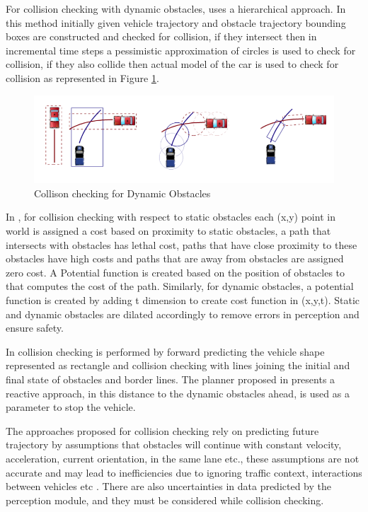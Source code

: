For collision checking with dynamic obstacles, \cite{kolski_thesis} uses a hierarchical approach. In this method initially given vehicle trajectory and obstacle trajectory bounding boxes are constructed and checked for collision, if they intersect then in incremental time steps a pessimistic approximation of circles is used to check for collision, if they also collide then actual model of the car is used to check for collision as represented in Figure \ref{kolskidynamicobst}.

\begin{figure}
	\centering
	\includegraphics[width=1.0\textwidth]{Images/related_work/kolskidynamicobstacles.png}
	\caption{Collison checking for Dynamic Obstacles \cite{kolski_thesis}}
	\label{kolskidynamicobst}
\end{figure} 

In \cite{cmu_parallel_thesis}, for collision checking with respect to static obstacles each (x,y) point in world is assigned a cost based on proximity to static obstacles, a path that intersects with obstacles has lethal cost, paths that have close proximity to these obstacles have high costs and paths that are away from obstacles are assigned zero cost. A Potential function is created based on the position of obstacles to that computes the cost of the path. Similarly, for dynamic obstacles, a potential function is created by adding t dimension to create cost function in (x,y,t). Static and dynamic obstacles are dilated accordingly to remove errors in perception and ensure safety.


In \cite{rrt_star} collision checking is performed by forward predicting the vehicle shape represented as rectangle and collision checking with lines joining the initial and final state of obstacles and border lines. The planner proposed in \cite{volvo_reactive_traj} presents a reactive approach, in this distance to the dynamic obstacles ahead, is used as a parameter to stop the vehicle.

The approaches proposed for collision checking rely on predicting future trajectory by assumptions that obstacles will continue with constant velocity, acceleration, current orientation, in the same lane etc., these assumptions are not accurate and may lead to inefficiencies due to ignoring traffic context, interactions between vehicles etc \cite{motion_planning_techniques}. There are also uncertainties in data predicted by the perception module, and they must be considered while collision checking.

